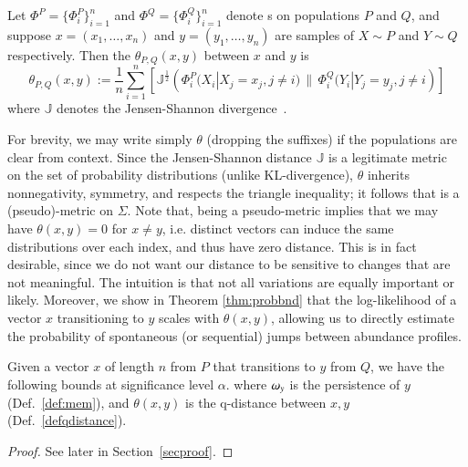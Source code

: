 \documentclass[onecolumn,10pt]{IEEEtran}
\def\x{x}
\def\y{y}
\begin{document}
\begin{defn}[\qdist]
  \label{defqdistance} 
  Let $\Phi^P = \{\Phi_i^P\}_{i=1}^n$ and $\Phi^Q = \{\Phi_i^Q\}_{i=1}^n$ denote {\qnet}s on populations $P$ and $Q$, and suppose $\x=(x_1, \ldots, x_n)$ and $\y =(y_1, \ldots, y_n)$ are samples of $X \sim P$ and $Y \sim Q$ respectively. Then the \qdist $\theta_{P,Q}(\x,\y)$ between $\x$ and $\y$ is\[\theta_{P,Q}(\x,\y) := \frac{1}{n}\sum_{i=1}^n \left[ \mathbb{J}^{\frac{1}{2}} \left(\Phi_i^P(X_i |X_j = x_j, j \neq i) \,\|\, \Phi_i^Q(Y_i|Y_j = y_j, j \neq i\right ) \right]\]%
  where $\mathbb{J}$ denotes the Jensen-Shannon divergence~\cite{cover}.
\end{defn}

For brevity, we may write simply $\theta$ (dropping the suffixes) if the populations are clear from context.  Since the Jensen-Shannon distance $\mathbb{J}$ is a legitimate metric~\cite{fuglede2004jensen} on the set of probability distributions (unlike KL-divergence), $\theta$ inherits nonnegativity, symmetry, and respects the triangle inequality; it follows that \qdist is a (pseudo)-metric on $\Sigma$. Note that, being a pseudo-metric implies that  we may have $\theta(\x, \y) = 0$ for $\x \neq \y$, i.e. distinct vectors can induce the same distributions over each index, and thus have zero distance. This is in fact desirable, since we do  not want  our distance to be sensitive to changes that are not meaningful.  The intuition is that not all variations are equally important or likely.    Moreover, we show in Theorem \ref{thm:probbnd} that the log-likelihood of a vector $\x$ transitioning to $\y$ scales with $\theta(\x,\y)$, allowing us to directly estimate the probability of spontaneous (or sequential) jumps between abundance profiles.

\begin{thm}\label{thm:probbnd}
  Given a vector $\x$ of length $n$ from $P$ that transitions to $\y$ from $Q$, we have the following bounds at significance level $\alpha$.
  \cgather{
    \mem{y} e^{ \frac{\sqrt{8}N^2}{1-\alpha}\theta(\x,\y)} \geqq Pr(\x \rightarrow \y) \geqq \mem{\y} e^{-\frac{\sqrt{8}N^2}{1-\alpha}\theta(\x,\y)}
  }%
  where $\mem{\y}$ is the persistence of  $\y$  (Def.~\ref{def:mem}), and $\theta(\x,\y)$ is the q-distance between $\x,\y$ (Def.~\ref{defqdistance}).
\end{thm}

\begin{proof}
  See later in Section~\ref{secproof}.
\end{proof}
\end{document}
